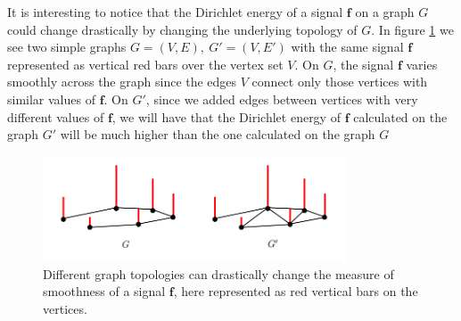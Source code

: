 \begin{remark}
	It is interesting to notice that the Dirichlet energy of a signal $\mathbf f$ on a graph $G$ could change drastically by changing the underlying topology of $G$. In figure \ref{fig:graph} we see two simple graphs $G=(V, E),\ G' =(V, E')$ with the same signal $\mathbf f$ represented as vertical red bars over the vertex set $V$. On $G$, the signal $\mathbf f$ varies smoothly across the graph since the edges $V$ connect only those vertices with similar values of $\mathbf f$. On $G'$, since we added edges between vertices with very different values of $\mathbf f$, we will have that the Dirichlet energy of $\mathbf f$ calculated on the graph $G'$ will be much higher than the one calculated on the graph $G$
\end{remark}
\begin{figure}
	\centering
	\includegraphics[width=0.8\textwidth]{figs/chapter1/graph.png}
	\caption{\label{fig:graph}Different graph topologies can drastically change the measure of smoothness of a signal $\mathbf f$, here represented as red vertical bars on the vertices.}
\end{figure}

